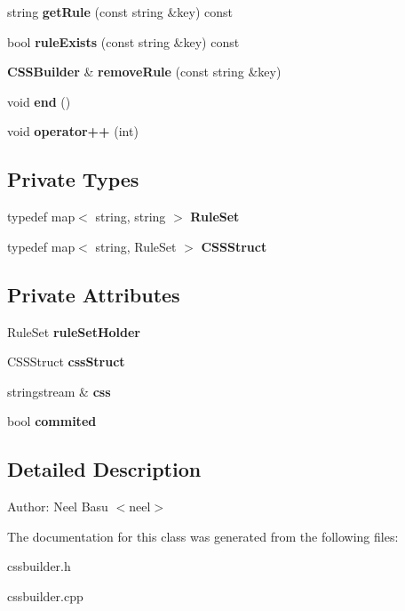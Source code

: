 \begin{CompactItemize}
\item 
string \textbf{getRule} (const string \&key) const \label{classCSSBuilder_9958d563db840d93dff2669b55b364c0}

\item 
bool \textbf{ruleExists} (const string \&key) const \label{classCSSBuilder_a37966d8b5e4cb2c7312792dabd468b3}

\item 
{\bf CSSBuilder} \& \textbf{removeRule} (const string \&key)\label{classCSSBuilder_b06a8ce4966ea4d43971753cf3a5e9dd}

\item 
void \textbf{end} ()\label{classCSSBuilder_54ba3e8cde28bd83cd826bb264501b87}

\item 
void \textbf{operator++} (int)\label{classCSSBuilder_cdd12d3ce197adf9354c52e0dfaae4d3}

\end{CompactItemize}
\subsection*{Private Types}
\begin{CompactItemize}
\item 
typedef map$<$ string, string $>$ \textbf{RuleSet}\label{classCSSBuilder_4ae6d912f49b0b2d89a83f6574d69a57}

\item 
typedef map$<$ string, RuleSet $>$ \textbf{CSSStruct}\label{classCSSBuilder_b89735abdf268ad33ca0200289093b50}

\end{CompactItemize}
\subsection*{Private Attributes}
\begin{CompactItemize}
\item 
RuleSet \textbf{ruleSetHolder}\label{classCSSBuilder_6605aac415cdde64fdb9e5a31e461c41}

\item 
CSSStruct \textbf{cssStruct}\label{classCSSBuilder_2ef417273221c02d7da1809c9f23d35d}

\item 
stringstream \& \textbf{css}\label{classCSSBuilder_dd9e1d740af527878f61460c81df0a6e}

\item 
bool \textbf{commited}\label{classCSSBuilder_e1fc8d817ebaad1fcfbf9f386fd305c9}

\end{CompactItemize}


\subsection{Detailed Description}
\begin{Desc}
\item[Author:]Neel Basu $<$neel$>$ \end{Desc}


The documentation for this class was generated from the following files:\begin{CompactItemize}
\item 
cssbuilder.h\item 
cssbuilder.cpp\end{CompactItemize}
